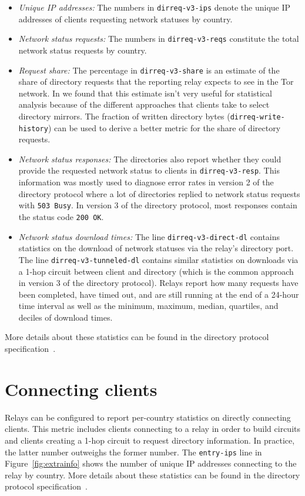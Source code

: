 \documentclass{article}
\begin{document}
\begin{itemize}
\item \textit{Unique IP addresses:} The numbers in \verb+dirreq-v3-ips+
denote the unique IP addresses of clients requesting network statuses by
country.
\item \textit{Network status requests:} The numbers in
\verb+dirreq-v3-reqs+ constitute the total network status requests by
country.
\item \textit{Request share:} The percentage in \verb+dirreq-v3-share+ is
an estimate of the share of directory requests that the reporting relay
expects to see in the Tor network.
In \cite{hahn2010privacy} we found that this estimate isn't very useful
for statistical analysis because of the different approaches that clients
take to select directory mirrors.
The fraction of written directory bytes (\verb+dirreq-write-history+) can
be used to derive a better metric for the share of directory requests.
\item \textit{Network status responses:} The directories also report
whether they could provide the requested network status to clients in
\verb+dirreq-v3-resp+.
This information was mostly used to diagnose error rates in version 2 of
the directory protocol where a lot of directories replied to network
status requests with \verb+503 Busy+.
In version 3 of the directory protocol, most responses contain the status
code \verb+200 OK+.
\item \textit{Network status download times:} The line
\verb+dirreq-v3-direct-dl+ contains statistics on the download of network
statuses via the relay's directory port.
The line \verb+dirreq-v3-tunneled-dl+ contains similar statistics on
downloads via a 1-hop circuit between client and directory (which is the
common approach in version 3 of the directory protocol).
Relays report how many requests have been completed, have timed out, and
are still running at the end of a 24-hour time interval as well as the
minimum, maximum, median, quartiles, and deciles of download times.
\end{itemize}
More details about these statistics can be found in the directory protocol
specification~\cite{dirspec}.

\section{Connecting clients}

Relays can be configured to report per-country statistics on directly
connecting clients.
This metric includes clients connecting to a relay in order to build
circuits and clients creating a 1-hop circuit to request directory
information.
In practice, the latter number outweighs the former number.
The \verb+entry-ips+ line in Figure~\ref{fig:extrainfo} shows the number
of unique IP addresses connecting to the relay by country.
More details about these statistics can be found in the directory protocol
specification~\cite{dirspec}.
\end{document}
